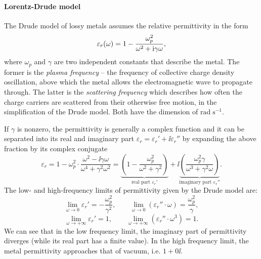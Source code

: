 \documentclass[letterpaper,12pt]{report}
\begin{document}
\paragraph{Lorentz-Drude model}
The Drude model of lossy metals assumes the relative permittivity in the form
\begin{equation} {\varepsilon_r}(\omega) = 1 - \frac{\omega_p^{2}}{\omega^{2} + {\mathrm i}\gamma\omega}, \label{eq_}\end{equation}
where $\omega_p$ and $\gamma$ are two independent constants that describe the metal.  The former is the \textit{plasma frequency} -- the frequency of collective charge density oscillation, above which the metal allows the electromagnetic wave to propagate through. The latter is the \textit{scattering frequency} which describes how often the charge carriers are scattered from their otherwise free motion, in the simplification of the Drude model. Both have the dimension of $\mathrm{rad\; s^{-1}}$. 

If $\gamma$ is nonzero, the permittivity is generally a complex function and it can be separated into its real and imaginary part $\varepsilon_r = \varepsilon_r'+\ii\varepsilon_r''$ by expanding the above fraction by its complex conjugate
\begin{equation} \varepsilon_r = 1 - \omega_p^{2} \cdot \frac{\omega^{2} - \ii \gamma \omega}{\omega^{4} + \gamma^{2} \omega^{2}} = 
		\underbrace{\left(1 - \frac{\omega_p^2}{\omega^2+\gamma^2}\right) }_{\text{real part } \varepsilon_r'}
+ \ii	\underbrace{\left(\frac{\omega_p^2\gamma}{\omega^3 + \gamma^2\omega}\right) }_{\text{imaginary part } \varepsilon_r''}.
\label{eq_}\end{equation}
The low- and high-frequency limits of permittivity given by the Drude model are:
\begin{equation} \lim_{\omega \to 0} \varepsilon_r' = -\frac{\omega_p^2}{\gamma^2}, \quad \quad  
				 \lim_{\omega \to 0} (\varepsilon_r'' \cdot \omega) = \frac{\omega_p^2}{\gamma},\label{eq_}\end{equation}
\begin{equation} \lim_{\omega \to +\infty} \varepsilon_r' = 1, \quad \quad  
				 \lim_{\omega \to +\infty} (\varepsilon_r'' \cdot \omega^3) = 1. \label{eq_}\end{equation}
We can see that in the low frequency limit, the imaginary part of permittivity diverges (while its real part has a finite value). In the high frequency limit, the metal permittivity approaches that of vacuum, i.e. $1+0\ii$.
\end{document}
